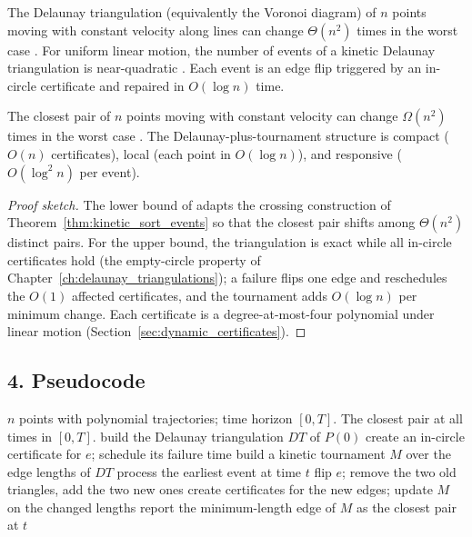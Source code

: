 \begin{theorem}\label{thm:kinetic_delaunay_bounds}
  The Delaunay triangulation (equivalently the Voronoi diagram) of $n$
  points moving with constant velocity along lines can change $\Theta(n^2)$
  times in the worst case \cite{albers1998}. For uniform linear motion, the
  number of events of a kinetic Delaunay triangulation is near-quadratic
  \cite{rubin2016}. Each event is an edge flip triggered by an in-circle
  certificate and repaired in $O(\log n)$ time.
\end{theorem}

\begin{theorem}\label{thm:kinetic_closest_pair_bounds}
  The closest pair of $n$ points moving with constant velocity can change
  $\Omega(n^2)$ times in the worst case \cite{basch1997proximity}. The
  Delaunay-plus-tournament structure is compact ($O(n)$ certificates), local
  (each point in $O(\log n)$), and responsive ($O(\log^2 n)$ per event).
\end{theorem}

\begin{proof}[Proof sketch]
  The lower bound of \cite{basch1997proximity} adapts the crossing
  construction of Theorem~\ref{thm:kinetic_sort_events} so that the closest
  pair shifts among $\Theta(n^2)$ distinct pairs. For the upper bound, the
  triangulation is exact while all in-circle certificates hold (the
  empty-circle property of Chapter~\ref{ch:delaunay_triangulations}); a
  failure flips one edge and reschedules the $O(1)$ affected certificates,
  and the tournament adds $O(\log n)$ per minimum change. Each certificate
  is a degree-at-most-four polynomial under linear motion
  (Section~\ref{sec:dynamic_certificates}).
\end{proof}

\subsection{4. Pseudocode}

\begin{algorithm}[htbp]
\caption{Kinetic Closest Pair via Kinetic Delaunay}
\label{alg:kinetic_closest_pair}
\begin{algorithmic}[1]
\Require $n$ points with polynomial trajectories; time horizon $[0, T]$.
\Ensure The closest pair at all times in $[0, T]$.
  \State build the Delaunay triangulation $DT$ of $P(0)$
    \State create an in-circle certificate for $e$; schedule its failure time
  \EndFor
  \State build a kinetic tournament $M$ over the edge lengths of $DT$
    \State process the earliest event at time $t$
      \State flip $e$; remove the two old triangles, add the two new ones
      \State create certificates for the new edges; update $M$ on the changed lengths
    \EndIf
    \State report the minimum-length edge of $M$ as the closest pair at $t$
  \EndWhile
\EndFunction
\end{algorithmic}
\end{algorithm}

